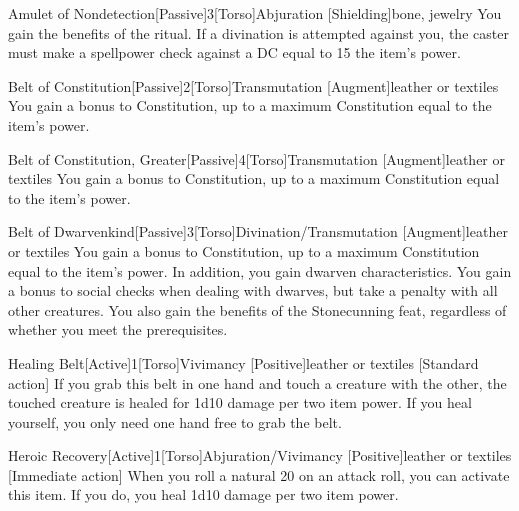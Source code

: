 \begin{magicitemdef}{Amulet of Nondetection}[Passive]{3}[Torso]{Abjuration [Shielding]}{bone, jewelry}
     You gain the benefits of the  ritual.
    If a divination is attempted against you, the caster must make a spellpower check against a DC equal to 15 \add the item's power.
\end{magicitemdef}

\begin{magicitemdef}{Belt of Constitution}[Passive]{2}[Torso]{Transmutation [Augment]}{leather or textiles}
     You gain a  bonus to Constitution, up to a maximum Constitution equal to the item's power.
\end{magicitemdef}

\begin{magicitemdef}{Belt of Constitution, Greater}[Passive]{4}[Torso]{Transmutation [Augment]}{leather or textiles}
     You gain a  bonus to Constitution, up to a maximum Constitution equal to the item's power.
\end{magicitemdef}

\begin{magicitemdef}{Belt of Dwarvenkind}[Passive]{3}[Torso]{Divination/Transmutation [Augment]}{leather or textiles}
     You gain a  bonus to Constitution, up to a maximum Constitution equal to the item's power.
    In addition, you gain dwarven characteristics.
    You gain a  bonus to social checks when dealing with dwarves, but take a  penalty with all other creatures.
    You also gain the benefits of the Stonecunning feat, regardless of whether you meet the prerequisites.
\end{magicitemdef}

\begin{magicitemdef}{Healing Belt}[Active]{1}[Torso]{Vivimancy [Positive]}{leather or textiles}
    [Standard action] If you grab this belt in one hand and touch a creature with the other, the touched creature is healed for 1d10 damage per two item power.
    If you heal yourself, you only need one hand free to grab the belt.
\end{magicitemdef}

\begin{magicitemdef}{Heroic Recovery}[Active]{1}[Torso]{Abjuration/Vivimancy [Positive]}{leather or textiles}
    [Immediate action] When you roll a natural 20 on an attack roll, you can activate this item. If you do, you heal 1d10 damage per two item power.
\end{magicitemdef}

